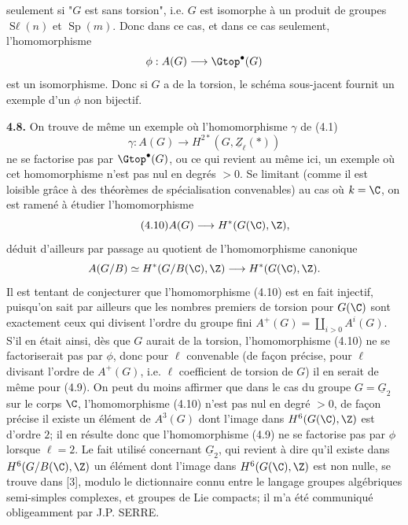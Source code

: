 
seulement si "$G$ est sans torsion", i.e. $G$ est isomorphe à un produit de groupes $\operatorname{S\ell}(n)$ et $\operatorname{Sp}(m)$. Donc dans ce cas, et dans ce cas seulement, l'homomorphisme
\[
 \phi:A(G)\longrightarrow\Gtop^\bullet(G)
\]
est un isomorphisme. Donc si $G$ a de la torsion, le schéma sous-jacent fournit un exemple d'un $\phi$ non bijectif.

\textbf{4.8.} On trouve de même un exemple où l'homomorphisme $\gamma$ de (4.1)
\begin{equation}\tag{4.9}
 \gamma:A(G)\longrightarrow H^{2*}(G,\underline{Z}_\ell(*))
\end{equation}
ne se factorise pas par $\Gtop^\bullet(G)$, ou ce qui revient au même ici, un exemple où cet homomorphisme n'est pas nul en degrés $>0$. Se limitant (comme il est loisible grâce à des théorèmes de spécialisation convenables) au cas où $k=\C$, on est ramené à étudier l'homomorphisme
\begin{equation}\tag{4.10}
 A(G)\longrightarrow H^*(G(\C),\Z),
\end{equation}
déduit d'ailleurs par passage au quotient de l'homomorphisme canonique
\[
 A(G/B)\simeq H^*(G/B(\C),\Z)\longrightarrow H^*(G(\C),\Z).
\]
Il est tentant de conjecturer que l'homomorphisme (4.10) est en fait injectif, puisqu'on sait par ailleurs que les nombres premiers de torsion pour $G(\C)$ sont exactement ceux qui divisent l'ordre du groupe fini $A^+(G)=\coprod_{i>0}A^i(G)$. S'il en était ainsi, dès que $G$ aurait de la torsion, l'homomorphisme (4.10) ne se factoriserait pas par $\phi$, donc pour $\ell$ convenable (de façon précise, pour $\ell$ divisant l'ordre de $A^+(G)$, i.e. $\ell$ coefficient de torsion de $G$) il en serait de même pour (4.9). On peut du moins affirmer que dans le cas du groupe $G=\underline{G}_2$ sur le corps $\C$, l'homomorphisme (4.10) n'est pas nul en degré $>0$, de façon précise il existe un élément de $A^3(G)$ dont l'image dans $H^6(G(\C),\Z)$ est d'ordre $2$; il en résulte donc que l'homomorphisme (4.9) ne se factorise pas par $\phi$ lorsque $\ell=2$. Le fait utilisé concernant $\underline{G}_2$, qui revient à dire qu'il existe dans $H^6(G/B(\C),\Z)$ un élément dont l'image dans $H^6(G(\C),\Z)$ est non nulle, se trouve dans [3], modulo le dictionnaire connu entre le langage groupes algébriques semi-simples complexes, et groupes de Lie compacts; il m'a été communiqué obligeamment par J.P. SERRE.

